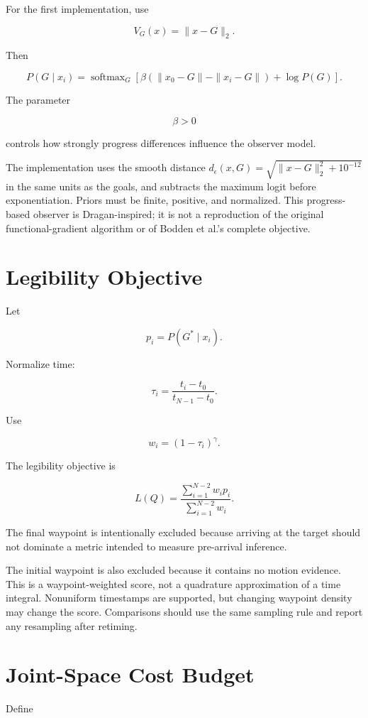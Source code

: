 \documentclass[11pt]{article}
\begin{document}
For the first implementation, use

\[
V_G(x)
=
\|x-G\|_2.
\]

Then

\[
P(G\mid x_i)
=
\operatorname{softmax}_G
\left[
\beta
(
\|x_0-G\|
-
\|x_i-G\|
)
+
\log P(G)
\right].
\]

The parameter

\[
\beta > 0
\]

controls how strongly progress differences influence the
observer model.

The implementation uses the smooth distance
$d_\epsilon(x,G)=\sqrt{\|x-G\|_2^2+10^{-12}}$ in the same units as the
goals, and subtracts the maximum logit before exponentiation.
Priors must be finite, positive, and normalized. This progress-based
observer is Dragan-inspired; it is not a reproduction of the original
functional-gradient algorithm or of Bodden et al.'s complete objective.

\section{Legibility Objective}

Let

\[
p_i =
P(G^*\mid x_i).
\]

Normalize time:

\[
\tau_i =
\frac{t_i-t_0}
{t_{N-1}-t_0}.
\]

Use

\[
w_i =
(1-\tau_i)^\gamma.
\]

The legibility objective is

\[
L(Q)
=
\frac{
\sum_{i=1}^{N-2}
w_i p_i
}{
\sum_{i=1}^{N-2}w_i
}.
\]

The final waypoint is intentionally excluded because arriving at
the target should not dominate a metric intended to measure
pre-arrival inference.

The initial waypoint is also excluded because it contains no motion
evidence. This is a waypoint-weighted score, not a quadrature approximation
of a time integral. Nonuniform timestamps are supported, but changing
waypoint density may change the score. Comparisons should use the same
sampling rule and report any resampling after retiming.

\section{Joint-Space Cost Budget}

Define
\end{document}
